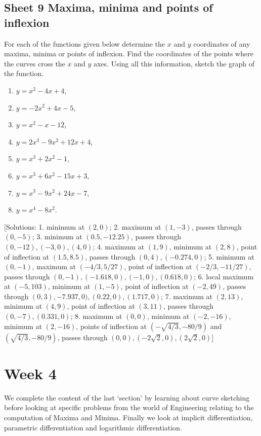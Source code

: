 \documentclass[
  11pt,
  oneside]{book}
\providecommand{\tightlist}{%
  \setlength{\itemsep}{0pt}\setlength{\parskip}{0pt}}
\theoremstyle{definition}
\theoremstyle{definition}
\theoremstyle{definition}
\theoremstyle{definition}
\theoremstyle{remark}
\begin{document}
\section{Sheet 9 Maxima, minima and points of inflexion}\label{sheet-9-maxima-minima-and-points-of-inflexion}

For each of the functions given below determine the \(x\) and \(y\) coordinates of any maxima, minima or points of inflexion. Find the coordinates of the points where the curves cross the \(x\) and \(y\) axes. Using all this information, sketch the graph of the function.

\begin{enumerate}
\def\labelenumi{\arabic{enumi}.}
\tightlist
\item
  \(y=x^2-4x+4\),
\item
  \(y=-2x^2+4x-5\),
\item
  \(y=x^2-x-12\),
\item
  \(y=2x^3-9x^2+12x+4\),
\item
  \(y=x^3+2x^2-1\),
\item
  \(y=x^3+6x^2-15x+3\),
\item
  \(y=x^3-9x^2+24x-7\),
\item
  \(y=x^4-8x^2\).
\end{enumerate}

{[}Solutions: 1. minimum at \((2,0)\); 2. maximum at \((1,-3)\), passes through \((0,-5)\); 3. minimum at \((0.5,-12.25)\), passes through \((0,-12), (-3,0), (4,0)\); 4. maximum at \((1,9)\), minimum at \((2,8)\), point of inflection at \((1.5,8.5)\), passes through \((0,4), (-0.274,0)\); 5. minimum at \((0,-1)\), maximum at \((-4/3,5/27)\), point of inflection at \((-2/3,-11/27)\), passes through \((0,-1), (-1.618,0), (-1,0), (0.618,0)\); 6. local maximum at \((-5,103)\), minimum at \((1,-5)\), point of inflection at \((-2,49)\), passes through \((0,3), -7.937,0), (0.22,0), (1.717,0)\); 7. maximum at \((2,13)\), minimum at \((4,9)\), point of inflection at \((3,11)\), passes through \((0,-7), (0.331,0)\); 8. maximum at \((0,0)\), minimum at \((-2,-16)\), minimum at \((2,-16)\), points of inflection at \((-\sqrt{4/3},-80/9)\) and \((\sqrt{4/3},-80/9)\), passes through \((0,0), (-2\sqrt{2},0), (2\sqrt{2},0)\){]}

\chapter{Week 4}\label{week-four}

We complete the content of the last `section' by learning about curve sketching before looking at specific problems from the world of Engineering relating to the computation of Maxima and Minima. Finally we look at implicit differentiation, parametric differentiation and logarithmic differentiation.
\end{document}
